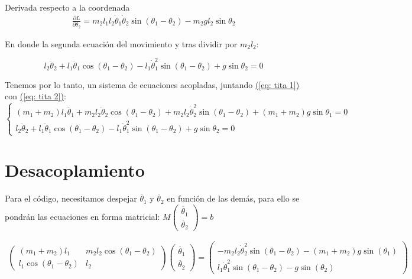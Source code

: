 \documentclass[11pt]{article}
\begin{document}
	Derivada respecto a la coordenada
	\begin{align*}
		\frac{\partial L}{\partial \theta_2} = m_2 l_1 l_2 \dot{\theta}_1 \dot{\theta}_2 \sin(\theta_1 - \theta_2) - m_2 g l_2 \sin\theta_2
	\end{align*}
	
	En donde la segunda ecuación del movimiento y tras dividir por $m_2l_2$:
	
	\begin{equation}
		l_2 \ddot{\theta}_2 + l_1 \ddot{\theta}_1 \cos(\theta_1 - \theta_2) - l_1 \dot{\theta}_1^2 \sin(\theta_1 - \theta_2) + g \sin\theta_2 = 0
		\label{eq: tita 2}
	\end{equation}
	
	Tenemos por lo tanto, un sistema de ecuaciones acopladas, juntando \hyperref[eq: tita 1]{(\ref{eq: tita 1})} con \hyperref[eq: tita 2]{(\ref{eq: tita 2})}:
	\begin{equation}
		\boxed{
			\begin{cases}
				(m_1 + m_2)l_1 \ddot{\theta}_1 + m_2 l_2 \ddot{\theta}_2 \cos(\theta_1 - \theta_2) + m_2 l_2 \dot{\theta}_2^2 \sin(\theta_1 - \theta_2) + (m_1 + m_2)g \sin\theta_1 = 0
				\\
				l_2 \ddot{\theta}_2 + l_1 \ddot{\theta}_1 \cos(\theta_1 - \theta_2) - l_1 \dot{\theta}_1^2 \sin(\theta_1 - \theta_2) + g \sin\theta_2 = 0
			\end{cases}
		}
	\end{equation}
	
	\section{Desacoplamiento}
	
	Para el código, necesitamos despejar $\ddot{\theta_1}$ y $\ddot{\theta_2}$ en función de las demás, para ello se pondrán las ecuaciones en forma matricial: $M \begin{pmatrix} \ddot{\theta_1} \\ \ddot{\theta_2} \end{pmatrix} = b$
	
	\begin{align}
		\boxed{\begin{pmatrix} 
			(m_1 + m_2) l_1 & m_2 l_2 \cos(\theta_1 - \theta_2) \\ 
			l_1 \cos(\theta_1 - \theta_2) & l_2 
		\end{pmatrix}
		\begin{pmatrix} 
			\ddot{\theta_1} \\ 
			\ddot{\theta_2}
		\end{pmatrix}
		=
		\begin{pmatrix} 
			-m_2 l_2 \dot{\theta}_2^2 \sin(\theta_1 - \theta_2) - (m_1 + m_2) g \sin(\theta_1) \\ 
			l_1 \dot{\theta}_1^2 \sin(\theta_1 - \theta_2) - g \sin(\theta_2) 
		\end{pmatrix}}	
	\end{align}
	
\end{document}
